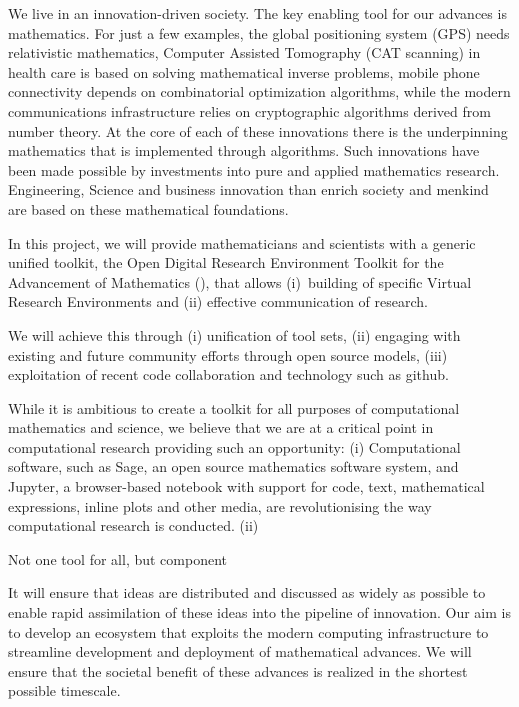 
We live in an innovation-driven society. The key enabling tool for our
advances is mathematics. For just a few examples, the global
positioning system (GPS) needs relativistic mathematics, Computer
Assisted Tomography (CAT scanning) in health care is based on solving
mathematical inverse problems, mobile phone connectivity depends on
combinatorial optimization algorithms, while the modern communications
infrastructure relies on cryptographic algorithms derived from number
theory. At the core of each of these innovations there is the
underpinning mathematics that is implemented through algorithms. Such
innovations have been made possible by investments into pure and
applied mathematics research. Engineering, Science and business
innovation than enrich society and menkind are based on these
mathematical foundations.



In this project, we will provide mathematicians and scientists with a
generic unified toolkit, the Open Digital Research Environment Toolkit
for the Advancement of Mathematics (\TheProject), that allows
(i)~building of specific Virtual Research Environments and (ii)
effective communication of research.

We will achieve this through (i) unification of tool sets, (ii)
engaging with existing and future community efforts through open
source models, (iii) exploitation of recent code collaboration and
technology such as github.


While it is ambitious to create a toolkit for all purposes of
computational mathematics and science, we believe that we are at a
critical point in computational research providing such an
opportunity: (i) Computational software, such as Sage, an open source
mathematics software system, and Jupyter, a browser-based notebook
with support for code, text, mathematical expressions, inline plots
and other media, are revolutionising the way computational research is conducted. (ii) 

Not one tool for all, but component 


It will ensure that ideas are distributed and discussed as
widely as possible to enable rapid assimilation of these ideas into
the pipeline of innovation. Our aim is to develop an ecosystem that
exploits the modern computing infrastructure to streamline development
and deployment of mathematical advances. We will ensure that the
societal benefit of these advances is realized in the shortest
possible timescale.


\clearpage


